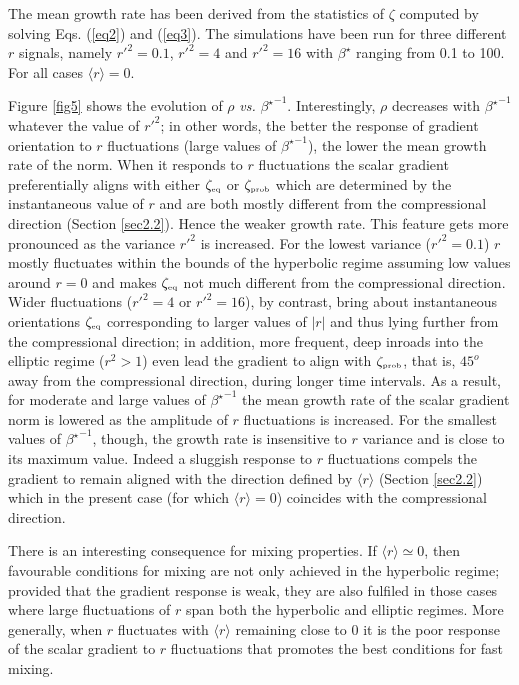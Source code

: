 \documentclass[doublespacing]{elsart}
\begin{document}
The mean growth rate has been derived from the statistics 
of $ \zeta $ computed by solving Eqs. (\ref{eq2}) and (\ref{eq3}).
The simulations have been 
run
for
three different $ r $ signals, namely
$ r'^2  = 0.1 $, $ r'^2 = 4 $ and $ r'^2 = 16 $
with
$ \beta^{\star} $ ranging from 
0.1 to 100.
For all cases $ \langle r \rangle = 0 $.

Figure \ref{fig5}
shows the evolution of $ \rho $ {\em vs.} $ {\beta^{\star}}^{-1} $.
Interestingly, $ \rho $ decreases with $ {\beta^{\star}}^{-1} $
whatever the value of $ r'^2 $;
in other words,
the better the response of gradient orientation to 
$ r $ fluctuations (large values of $ {\beta^{\star}}^{-1} $),
the lower the mean growth rate
of the norm.
When it responds to $ r $
fluctuations
the scalar gradient preferentially aligns with 
either $ \zeta_{\mbox{\tiny eq}} $ or $ \zeta_{\mbox{\tiny prob}} $
which are determined by the instantaneous value of $ r $ and
are both mostly different from the compressional direction
(Section \ref{sec2.2}).
Hence the weaker growth rate.
This feature 
gets more pronounced as the variance $ r'^2 $ is increased.
For the lowest variance ($ r'^2 = 0.1 $) $ r $ mostly fluctuates
within the bounds of the hyperbolic regime 
assuming low values
around $ r = 0 $
and
makes $ \zeta_{\mbox{\tiny eq}} $
not much different from the compressional direction. 
Wider fluctuations ($ r'^2 = 4 $ or $ r'^2 = 16 $),
by contrast,
bring about instantaneous orientations $ \zeta_{\mbox{\tiny eq}} $
corresponding to
larger values of $ |r| $
and thus
lying further from the compressional direction; 
in addition,
more frequent,
deep inroads into the elliptic regime
($ r^2 > 1 $) even 
lead the gradient 
to align with $ \zeta_{\mbox{\tiny prob}} $, that is,
$ 45^o $ away from the compressional direction,
during longer time intervals.
As a result, 
for moderate and large values of $ {\beta^{\star}}^{-1} $
the mean growth rate of the scalar gradient norm is lowered
as the amplitude of $ r $ fluctuations is increased.
For the smallest values of $ {\beta^{\star}}^{-1} $, though,
the growth rate is insensitive to $ r $ variance and 
is close to
its maximum value.
Indeed a sluggish response to $ r $ fluctuations
compels
the gradient to remain aligned with the direction defined by
$ \langle r \rangle $ (Section \ref{sec2.2}) which in the present
case 
(for which $ \langle r \rangle = 0 $)
coincides with the compressional direction.

There is an
interesting consequence for mixing properties.
If $ \langle r \rangle \simeq 0 $,
then
favourable
conditions for mixing are not only achieved in the hyperbolic
regime; 
provided that the gradient response
is weak, 
they are also fulfiled
in those cases where large fluctuations of $ r $ span 
both the hyperbolic and elliptic regimes.
More generally, 
when $ r $ fluctuates with $ \langle r \rangle $ remaining
close to 0 it is the poor response of the scalar gradient
to $ r $ fluctuations
that
promotes the best conditions for fast mixing. 
\end{document}
